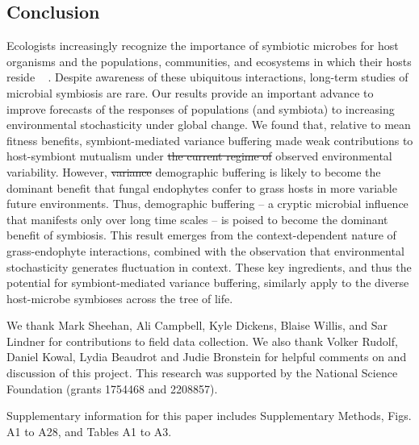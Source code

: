 \documentclass[lineno,sn-nature]{sn-jnl}%
\providecommand{\DIFadd}[1]{{\protect\color{blue}#1}} %
\providecommand{\DIFdel}[1]{{\protect\color{red}\protect\scriptsize\sout{#1}}}
\providecommand{\DIFadd}[1]{{\protect\color{blue}\uwave{#1}}} %
\providecommand{\DIFdel}[1]{{\protect\color{red}\sout{#1}}}                      %
\providecommand{\DIFaddbegin}{} %
\providecommand{\DIFaddend}{} %
\providecommand{\DIFdelbegin}{} %
\providecommand{\DIFdelend}{} %
\newcommand{\DIFscaledelfig}{0.5}
\newlength{\DIFdelgraphicswidth} %
\newlength{\DIFdelgraphicsheight} %
\newcommand{\DIFaddincludegraphics}[2][]{{\color{blue}\fbox{\DIFOincludegraphics[#1]{#2}}}} %
\newcommand{\DIFdelincludegraphics}[2][]{%
\sbox{\DIFdelgraphicsbox}{\DIFOincludegraphics[#1]{#2}}%
\settoboxwidth{\DIFdelgraphicswidth}{\DIFdelgraphicsbox} %
\settoboxtotalheight{\DIFdelgraphicsheight}{\DIFdelgraphicsbox} %
\scalebox{\DIFscaledelfig}{%
\parbox[b]{\DIFdelgraphicswidth}{\usebox{\DIFdelgraphicsbox}\\[-\baselineskip] \rule{\DIFdelgraphicswidth}{0em}}\llap{\resizebox{\DIFdelgraphicswidth}{\DIFdelgraphicsheight}{%
\setlength{\unitlength}{\DIFdelgraphicswidth}%
\begin{picture}(1,1)%
\thicklines\linethickness{2pt} %
{\color[rgb]{1,0,0}\put(0,0){\framebox(1,1){}}}%
{\color[rgb]{1,0,0}\put(0,0){\line( 1,1){1}}}%
{\color[rgb]{1,0,0}\put(0,1){\line(1,-1){1}}}%
\end{picture}%
}\hspace*{3pt}}} %
} %
\DeclareRobustCommand{\DIFaddbegin}{\DIFOaddbegin \let\includegraphics\DIFaddincludegraphics} %
\DeclareRobustCommand{\DIFaddend}{\DIFOaddend \let\includegraphics\DIFOincludegraphics} %
\DeclareRobustCommand{\DIFdelbegin}{\DIFOdelbegin \let\includegraphics\DIFdelincludegraphics} %
\DeclareRobustCommand{\DIFdelend}{\DIFOaddend \let\includegraphics\DIFOincludegraphics} %
\begin{document}
\subsection*{\DIFadd{Conclusion}}
\DIFadd{Ecologists increasingly recognize the importance of symbiotic microbes for host organisms and the populations, communities, and ecosystems in which their hosts reside \mbox{%
\cite{afkhami2016native,smith2017symbiont,dallas2022captivity,wu2022reduction}}\hspace{0pt}%
.
Despite awareness of these ubiquitous interactions, long-term studies of microbial symbiosis are rare. 
Our results provide an important advance to improve forecasts of the responses of populations (and symbiota) to increasing environmental stochasticity under global change. 
We found that, relative to mean fitness }\DIFaddend benefits, symbiont-mediated variance buffering made weak contributions to host-symbiont mutualism under \DIFdelbegin \DIFdel{the current regime of }\DIFdelend \DIFaddbegin \DIFadd{observed }\DIFaddend environmental variability.
However, \DIFdelbegin \DIFdel{variance }\DIFdelend \DIFaddbegin \DIFadd{demographic }\DIFaddend buffering is likely to become the dominant benefit that fungal endophytes confer to grass hosts in more variable future environments.
\DIFaddbegin \DIFadd{Thus, demographic buffering -- a cryptic microbial influence that manifests only over long time scales -- is poised to become the dominant benefit of symbiosis.
}\DIFaddend This result emerges from the context-dependent nature of grass-endophyte interactions, combined with the observation that environmental stochasticity generates fluctuation in context. 
These key ingredients, and thus the potential for symbiont-mediated variance buffering, similarly apply to the diverse host-microbe symbioses across the tree of life. 
\newpage

\backmatter


We thank Mark Sheehan, Ali Campbell, Kyle Dickens, Blaise Willis, and Sar Lindner for contributions to field data collection. 
We also thank Volker Rudolf, Daniel Kowal, Lydia Beaudrot and Judie Bronstein for helpful comments on and discussion of this project. 
This research was supported by the National Science Foundation (grants 1754468 and 2208857). 


 Supplementary information for this paper includes Supplementary Methods, Figs. A1 to A28, and Tables A1 to A3. 

\clearpage
\end{document}
